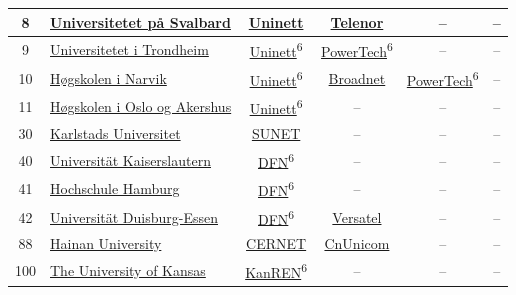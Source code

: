 \begin{small}
\begin{center}
\begin{longtable}{|c|c|c|c|c|c|}
 8 & \multicolumn{1}{|l|}{\index{Universitetet på Svalbard}\index{Site!Universitetet på Svalbard}\hyperref[sec:UNIS]{Universitetet på Svalbard}} & \href{https://www.uninett.no}{Uninett} & \href{https://www.telenor.no}{Telenor} & – & – \\ \hline
 9 & \multicolumn{1}{|l|}{\index{Universitetet i Trondheim}\index{Site!Universitetet i Trondheim}\hyperref[sec:NTNU]{Universitetet i Trondheim}} & \href{https://www.uninett.no}{Uninett}\textsuperscript{6} & \href{http://www.powertech.no}{PowerTech}\textsuperscript{6} & – & – \\ \hline
 10 & \multicolumn{1}{|l|}{\index{Høgskolen i Narvik}\index{Site!Høgskolen i Narvik}\hyperref[sec:HiN]{Høgskolen i Narvik}} & \href{https://www.uninett.no}{Uninett}\textsuperscript{6} & \href{https://www.broadnet.no}{Broadnet} & \href{http://www.powertech.no}{PowerTech}\textsuperscript{6} & – \\ \hline
 11 & \multicolumn{1}{|l|}{\index{Høgskolen i Oslo og Akershus}\index{Site!Høgskolen i Oslo og Akershus}\hyperref[sec:HiOA]{Høgskolen i Oslo og Akershus}} & \href{https://www.uninett.no}{Uninett}\textsuperscript{6} & – & – & – \\ \hline
 30 & \multicolumn{1}{|l|}{\index{Karlstads Universitet}\index{Site!Karlstads Universitet}\hyperref[sec:KAU]{Karlstads Universitet}} & \href{http://www.sunet.se}{SUNET} & – & – & – \\ \hline
 40 & \multicolumn{1}{|l|}{\index{Universität Kaiserslautern}\index{Site!Universität Kaiserslautern}\hyperref[sec:TUKL]{Universität Kaiserslautern}} & \href{https://www.dfn.de}{DFN}\textsuperscript{6} & – & – & – \\ \hline
 41 & \multicolumn{1}{|l|}{\index{Hochschule Hamburg}\index{Site!Hochschule Hamburg}\hyperref[sec:HAW]{Hochschule Hamburg}} & \href{https://www.dfn.de}{DFN}\textsuperscript{6} & – & – & – \\ \hline
 42 & \multicolumn{1}{|l|}{\index{Universität Duisburg-Essen}\index{Site!Universität Duisburg-Essen}\hyperref[sec:UDE]{Universität Duisburg-Essen}} & \href{https://www.dfn.de}{DFN}\textsuperscript{6} & \href{http://www.versatel.de}{Versatel} & – & – \\ \hline
 88 & \multicolumn{1}{|l|}{\index{Hainan University}\index{Site!Hainan University}\hyperref[sec:HU]{Hainan University}} & \href{http://www.cernet.edu.cn}{CERNET} & \href{http://www.chinaunicom.com}{CnUnicom} & – & – \\ \hline
 100 & \multicolumn{1}{|l|}{\index{The University of Kansas}\index{Site!The University of Kansas}\hyperref[sec:KU]{The University of Kansas}} & \href{http://www.kanren.net}{KanREN}\textsuperscript{6} & – & – & – \\ \hline

\end{longtable}
\end{center}
\end{small}
